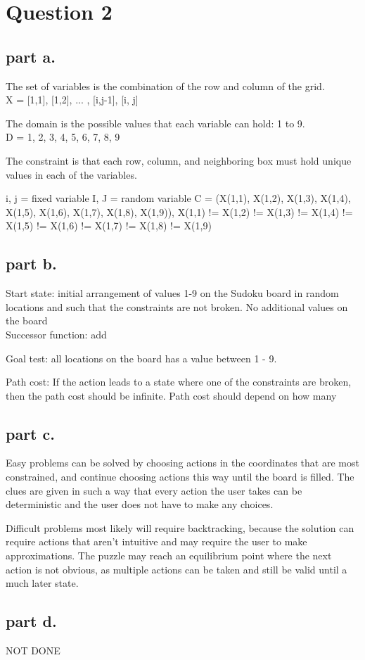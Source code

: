 \section{Question 2}

\subsection{part a.}
The set of variables is the combination of the row and column of the grid. \\
X = {[1,1], [1,2], ... , [i,j-1], [i, j]}

The domain is the possible values that each variable can hold: 1 to 9.\\
D = {1, 2, 3, 4, 5, 6, 7, 8, 9}

The constraint is that each row, column, and neighboring box must hold unique values in each of the variables.

i, j = fixed variable
I, J = random variable
C = {(X(1,1), X(1,2), X(1,3), X(1,4), X(1,5), X(1,6), X(1,7), X(1,8), X(1,9)), X(1,1) != X(1,2) != X(1,3) != X(1,4) != X(1,5) != X(1,6) != X(1,7) != X(1,8) != X(1,9)}

\subsection{part b.}
Start state: initial arrangement of values 1-9 on the Sudoku board in random locations and such that the constraints are not broken. No additional values on the board\\

Successor function: add

Goal test: all locations on the board has a value between 1 - 9.

Path cost: If the action leads to a state where one of the constraints are broken, then the path cost should be infinite. Path cost should depend on how many 

\subsection{part c.}
Easy problems can be solved by choosing actions in the coordinates that are most constrained, and continue choosing actions this way until the board is filled. The clues are given in such a way that every action the user takes can be deterministic and the user does not have to make any choices.


Difficult problems most likely will require backtracking, because the solution can require actions that aren't intuitive and may require the user to make approximations. The puzzle may reach an equilibrium point where the next action is not obvious, as multiple actions can be taken and still be valid until a much later state.

\subsection{part d.}
NOT DONE
